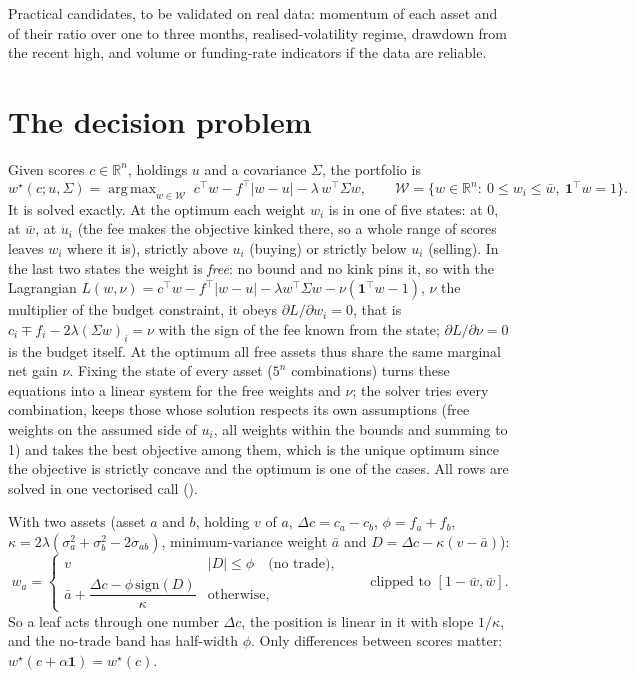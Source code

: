 \documentclass[11pt,a4paper]{article}
\newcommand{\code}[1]{\texttt{\detokenize{#1}}}
\DeclareMathOperator*{\argmax}{arg\,max}
\newcommand{\R}{\mathbb{R}}
\newcommand{\1}{\mathbf{1}}
\newcommand{\W}{\mathcal{W}}
\begin{document}
Practical candidates, to be validated on real data: momentum of each asset and of their ratio over one to three months, realised-volatility regime, drawdown from the recent high, and volume or funding-rate indicators if the data are reliable.

\section{The decision problem}\label{sec:decision}
Given scores $c\in\R^n$, holdings $u$ and a covariance $\Sigma$, the portfolio is
\begin{equation}\label{eq:opt}
w^\star(c;u,\Sigma)=\argmax_{w\in\W}\;c^\top w-f^\top|w-u|-\lambda\,w^\top\Sigma w,
\qquad \W=\{w\in\R^n:\ 0\le w_i\le\bar w,\ \1^\top w=1\}.
\end{equation}
It is solved exactly. At the optimum each weight $w_i$ is in one of five states: at $0$, at $\bar w$, at $u_i$ (the fee makes the objective kinked there, so a whole range of scores leaves $w_i$ where it is), strictly above $u_i$ (buying) or strictly below $u_i$ (selling). In the last two states the weight is \emph{free}: no bound and no kink pins it, so with the Lagrangian $L(w,\nu)=c^\top w-f^\top|w-u|-\lambda w^\top\Sigma w-\nu(\1^\top w-1)$, $\nu$ the multiplier of the budget constraint, it obeys $\partial L/\partial w_i=0$, that is $c_i\mp f_i-2\lambda(\Sigma w)_i=\nu$ with the sign of the fee known from the state; $\partial L/\partial\nu=0$ is the budget itself. At the optimum all free assets thus share the same marginal net gain $\nu$. Fixing the state of every asset ($5^n$ combinations) turns these equations into a linear system for the free weights and $\nu$; the solver tries every combination, keeps those whose solution respects its own assumptions (free weights on the assumed side of $u_i$, all weights within the bounds and summing to 1) and takes the best objective among them, which is the unique optimum since the objective is strictly concave and the optimum is one of the cases. All rows are solved in one vectorised call (\code{PortfolioOptimizer.solve}).

With two assets (asset $a$ and $b$, holding $v$ of $a$, $\Delta c=c_a-c_b$, $\phi=f_a+f_b$, $\kappa=2\lambda(\sigma_a^2+\sigma_b^2-2\sigma_{ab})$, minimum-variance weight $\bar a$ and $D=\Delta c-\kappa(v-\bar a)$):
\begin{equation}\label{eq:twoasset}
w_a=\begin{cases} v & |D|\le\phi\quad\text{(no trade)},\\[2pt] \bar a+\dfrac{\Delta c-\phi\,\mathrm{sign}(D)}{\kappa} & \text{otherwise,}\end{cases}\qquad\text{clipped to }[1-\bar w,\bar w].
\end{equation}
So a leaf acts through one number $\Delta c$, the position is linear in it with slope $1/\kappa$, and the no-trade band has half-width $\phi$. Only differences between scores matter: $w^\star(c+\alpha\1)=w^\star(c)$.
\end{document}
